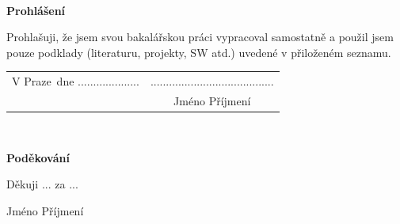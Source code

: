 \documentclass[a4paper,oneside,12pt]{book}
\newcommand{\tb}{\textbf} %
\newcommand{\woman}{} %
\newcommand{\autor}{Jméno Příjmení}   %
\newcommand{\kde}{Praze} %
\newcommand{\prohlaseni}{Prohlašuji, že jsem svou bakalářskou práci vypracoval\woman{} samostatně a použil\woman{} jsem pouze podklady (literaturu, projekty, SW atd.) uvedené v přiloženém seznamu.} %
\newcommand{\podekovani}{Děkuji ... za ...} %
\begin{document}





\newpage %
\thispagestyle{empty}  %

~ %
\vfill %

\tb{Prohlášení} %

\vspace{1em} %
\prohlaseni

\vspace{2em}  %
\hspace{-0.5em}\begin{tabularx}{\textwidth}{X c}  %
V \kde\ dne .................... &........................................ \\	%
	& \autor
\end{tabularx}	%


\newpage
\thispagestyle{empty}

~
\vfill %

\tb{Poděkování}

\vspace{1em} %
\podekovani
\begin{flushright}
\autor
\end{flushright}  %


\newpage   %
\thispagestyle{empty}   %
\end{document}
